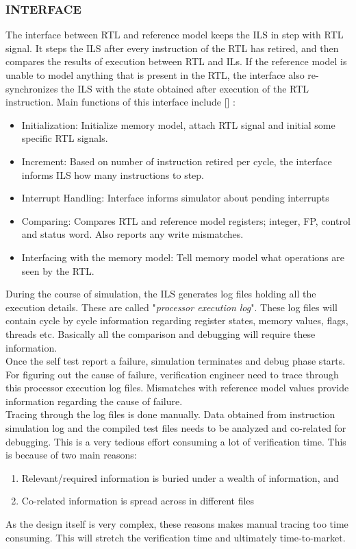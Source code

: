\subsubsection {INTERFACE}
The interface between RTL and reference model keeps the ILS in step with RTL signal. It steps the ILS after every instruction of the RTL has retired, and then compares the results of execution between RTL and ILs. If the reference model is unable to model anything that is present in the RTL, the interface also re-synchronizes the ILS with the state obtained after execution of the RTL instruction.
Main functions of this interface include [] :
\begin{itemize}
	\item Initialization: Initialize memory model, attach RTL signal and initial some specific RTL signals.
	\item Increment: Based on number of instruction retired per cycle, the interface informs ILS how many instructions to step.
	\item Interrupt Handling: Interface informs simulator about pending interrupts
	\item Comparing: Compares RTL and reference model registers; integer, FP, control and status word. Also reports any write mismatches. 
	\item Interfacing with the memory model: Tell memory model what operations are seen by the RTL. 
\end{itemize}


During the course of simulation, the ILS generates log files holding all the execution details. These are called "\emph {processor execution log}". These log files will contain cycle by cycle information regarding register states, memory values, flags, threads etc. Basically all the comparison and debugging will require these information.\\

Once the self test report a failure, simulation terminates and debug phase starts. For figuring out the cause of failure, verification engineer need to trace through this processor execution log files. Mismatches with reference model values provide information regarding the cause of failure. \\

Tracing through the log files is done manually. Data obtained from instruction simulation log and the compiled test files needs to be analyzed and co-related for debugging. This is a very tedious effort consuming a lot of verification time. This is because of two main reasons:

\begin{enumerate}
	\item Relevant/required information is buried under a wealth of information, and
	\item Co-related information is spread across in different files
\end{enumerate}

As the design itself is very complex, these reasons makes manual tracing too time consuming. This will stretch the verification time and ultimately time-to-market.   


